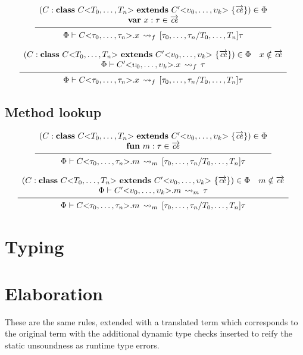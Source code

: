 \documentclass[fleqn, draft]{article}
\makeatletter
\newcommand{\TApp}[2]{#1\mathrm{<}#2\mathrm{>}}
\newcommand{\kwclass}{\kw{class}}
\newcommand{\kwextends}{\kw{extends}}
\newcommand{\kwfun}{\kw{fun}}
\newcommand{\kwvar}{\kw{var}}
\newcommand{\dclass}[3]{\kwclass\ #1\ \kwextends\ #2\ \{#3\}}
\newcommand{\fieldDecl}[2]{\kwvar\ #1 : #2}
\newcommand{\methodDecl}[2]{\kwfun\ #1 : #2}
\newcommand{\many}[1]{\overrightarrow{#1}}
\newcommand{\infrulem}[3][]{
  \begin{array}{c@{\ }c}
    \begin{array}{cccc}
      #2 \vspace{-2mm} 
    \end{array} \\
    \hrulefill & #1 \\
    \begin{array}{l}
      #3
    \end{array}
  \end{array}
  }
\newcommand{\infrule}[3][]{
  \[ 
  \infrulem[#1]{#2}{#3}
  \]
  }
\newcommand{\fieldLookup}[4]{#1 \vdash #2.#3\, \leadsto_f\, #4}
\newcommand{\methodLookup}[4]{#1 \vdash #2.#3\, \leadsto_m\, #4}
\newcommand{\subst}[2]{[#1/#2]}
\makeatother
\begin{document}
\infrule{(C : \dclass{\TApp{C}{T_0,\ldots,T_n}}{\TApp{C'}{\upsilon_0, \ldots, \upsilon_k}}{\many{\mathit{ce}}}) \in \Phi \\
          \fieldDecl{x}{\tau} \in \many{\mathit{ce}}
        }
        {\fieldLookup{\Phi}{\TApp{C}{\tau_0, \ldots, \tau_n}}{x}{\subst{\tau_0, \ldots, \tau_n}{T_0, \ldots, T_n}{\tau}}
        }

\infrule{(C : \dclass{\TApp{C}{T_0,\ldots,T_n}}{\TApp{C'}{\upsilon_0, \ldots, \upsilon_k}}{\many{\mathit{ce}}}) \in \Phi \quad x \notin \many{\mathit{ce}} \\
         \fieldLookup{\Phi}{\TApp{C'}{\upsilon_0, \ldots, \upsilon_k}}{x}{\tau}
        }
        {\fieldLookup{\Phi}{\TApp{C}{\tau_0, \ldots, \tau_n}}{x}{\subst{\tau_0, \ldots, \tau_n}{T_0, \ldots, T_n}{\tau}}
        }

\subsection*{Method lookup}

\infrule{(C : \dclass{\TApp{C}{T_0,\ldots,T_n}}{\TApp{C'}{\upsilon_0, \ldots, \upsilon_k}}{\many{\mathit{ce}}}) \in \Phi \\
          \methodDecl{m}{\tau} \in \many{\mathit{ce}}
        }
        {\methodLookup{\Phi}{\TApp{C}{\tau_0, \ldots, \tau_n}}{m}{\subst{\tau_0, \ldots, \tau_n}{T_0, \ldots, T_n}{\tau}}
        }

\infrule{(C : \dclass{\TApp{C}{T_0,\ldots,T_n}}{\TApp{C'}{\upsilon_0, \ldots, \upsilon_k}}{\many{\mathit{ce}}}) \in \Phi \quad m \notin \many{\mathit{ce}} \\
         \methodLookup{\Phi}{\TApp{C'}{\upsilon_0, \ldots, \upsilon_k}}{m}{\tau}
        }
        {\methodLookup{\Phi}{\TApp{C}{\tau_0, \ldots, \tau_n}}{m}{\subst{\tau_0, \ldots, \tau_n}{T_0, \ldots, T_n}{\tau}}
        }



\section*{Typing}


\section*{Elaboration}

These are the same rules, extended with a translated term which corresponds to
the original term with the additional dynamic type checks inserted to reify the
static unsoundness as runtime type errors.


\end{document}
